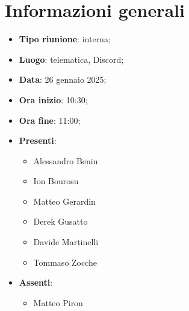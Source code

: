 \section{Informazioni generali}
\begin{itemize}
  \item \textbf{Tipo riunione}: interna;
  \item \textbf{Luogo}: telematica, Discord;
  \item \textbf{Data}: 26 gennaio 2025;
  \item \textbf{Ora inizio}: 10:30;
  \item \textbf{Ora fine}: 11:00;
  
  \item \textbf{Presenti}:
  \begin{itemize}
    \item Alessandro Benin
    \item Ion Bourosu
    \item Matteo Gerardin
    \item Derek Gusatto
    \item Davide Martinelli
    \item Tommaso Zocche
  \end{itemize}

  \item \textbf{Assenti}:
    \begin{itemize}
    
    \item Matteo Piron
   
  \end{itemize}
 
\end{itemize}